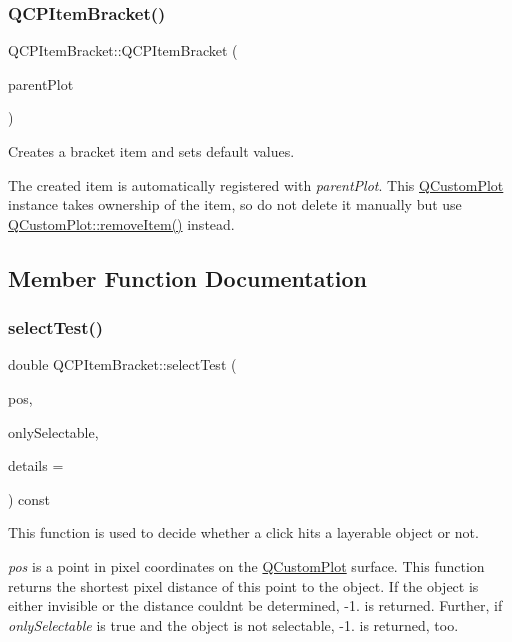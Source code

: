 \subsubsection{\texorpdfstring{Q\+C\+P\+Item\+Bracket()}{QCPItemBracket()}}
{\footnotesize\ttfamily Q\+C\+P\+Item\+Bracket\+::\+Q\+C\+P\+Item\+Bracket (\begin{DoxyParamCaption}\item[{\mbox{\hyperlink{class_q_custom_plot}{Q\+Custom\+Plot}} $\ast$}]{parent\+Plot }\end{DoxyParamCaption})\hspace{0.3cm}{\ttfamily [explicit]}}

Creates a bracket item and sets default values.

The created item is automatically registered with {\itshape parent\+Plot}. This \mbox{\hyperlink{class_q_custom_plot}{Q\+Custom\+Plot}} instance takes ownership of the item, so do not delete it manually but use \mbox{\hyperlink{class_q_custom_plot_ae04446557292551e8fb6e2c106e1848d}{Q\+Custom\+Plot\+::remove\+Item()}} instead. 

\subsection{Member Function Documentation}
\mbox{\label{class_q_c_p_item_bracket_a49a6b2f41e0a8c2a2e3a2836027a8455}} 
\subsubsection{\texorpdfstring{select\+Test()}{selectTest()}}
{\footnotesize\ttfamily double Q\+C\+P\+Item\+Bracket\+::select\+Test (\begin{DoxyParamCaption}\item[{const Q\+PointF \&}]{pos,  }\item[{bool}]{only\+Selectable,  }\item[{Q\+Variant $\ast$}]{details = {} }\end{DoxyParamCaption}) const\hspace{0.3cm}{\ttfamily [virtual]}}

This function is used to decide whether a click hits a layerable object or not.

{\itshape pos} is a point in pixel coordinates on the \mbox{\hyperlink{class_q_custom_plot}{Q\+Custom\+Plot}} surface. This function returns the shortest pixel distance of this point to the object. If the object is either invisible or the distance couldn\textquotesingle{}t be determined, -\/1. is returned. Further, if {\itshape only\+Selectable} is true and the object is not selectable, -\/1. is returned, too.

